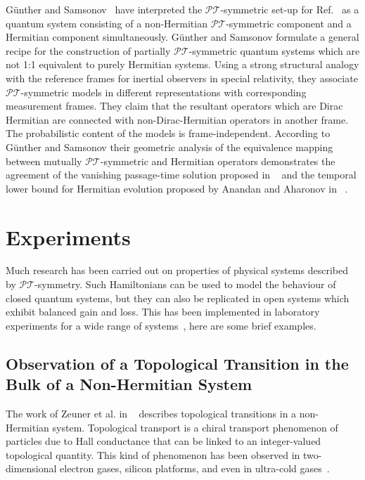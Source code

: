 \documentclass[12pt, a4paper]{report}
\newcommand\PT{\(\mathcal{PT}\)}
\begin{document}
G\"{u}nther and Samsonov~\cite{Gunther_2008} have interpreted the \PT-symmetric set-up for Ref.~\cite{Bender_2007} as a quantum system consisting of a non-Hermitian \PT-symmetric component and a Hermitian component simultaneously. G\"{u}nther and Samsonov formulate a general recipe for the construction of partially \PT-symmetric quantum systems which are not 1:1 equivalent to purely Hermitian systems. Using a strong structural analogy with the reference frames for inertial observers in special relativity, they associate \PT-symmetric models in different
representations with corresponding measurement frames. They claim that the resultant operators which are Dirac Hermitian
are connected with non-Dirac-Hermitian operators in another frame. The probabilistic content of the models
is frame-independent. According to G\"{u}nther and Samsonov their geometric analysis of the equivalence mapping between mutually \PT-symmetric and Hermitian operators demonstrates the agreement of the vanishing passage-time solution proposed in ~\cite{Bender_2007} and the temporal lower bound for Hermitian evolution proposed by Anandan and Aharonov in ~\cite{AnandanAharonov}. 

\chapter{Experiments}\label{Experiments}
Much research has been carried out on properties of physical systems described by \PT-symmetry. Such Hamiltonians can be used to model the behaviour of closed quantum systems, but they can also be replicated in open systems which exhibit balanced gain and loss. This has been implemented in laboratory experiments for a wide range of systems~\cite{geometric_aspects}, here are some brief examples.

\section{Observation of a Topological Transition in the Bulk of a Non-Hermitian System}\label{TopologicalTrans}
The work of Zeuner et al. in ~\cite{TopoTrans} describes topological transitions in a non-Hermitian system. 
Topological transport is a chiral transport phenomenon of particles due to Hall conductance that can be linked to an integer-valued topological quantity. This kind of phenomenon has been observed in two-dimensional electron gases, silicon platforms, and even in ultra-cold gases~\cite{TopoTrans}. 
\end{document}
